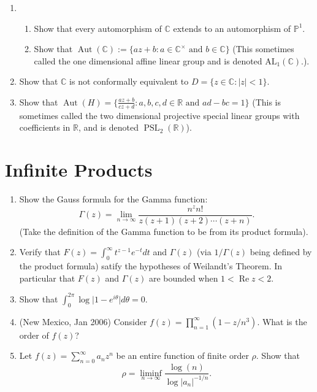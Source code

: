 \documentclass[a4paper,10pt]{article}
\newcommand{\RR}{\mathbb{R}}
\newcommand{\CC}{\mathbb{C}}
\newcommand{\PSL}{\operatorname{PSL}}
\renewcommand{\Re}{\operatorname{Re}}
\newcommand{\PP}{\mathbb{P}}
\newcommand{\Aut}{\operatorname{Aut}}
\begin{document}
\begin{enumerate}
\item 
\begin{enumerate}
	\item Show that every automorphism of $\CC$ extends to an automorphism of $\PP^1$.
	\item Show that $\Aut(\CC):= \lbrace az+b : a \in \CC^{\times} \mbox{ and } b\in \CC \rbrace$ (This sometimes called the one dimensional affine linear group and is denoted $\mathrm{AL}_1(\CC)$.).
\end{enumerate}

\item Show that $\CC$ is not conformally equivalent to $D = \lbrace z \in \CC: \vert z \vert < 1 \rbrace$. 

\item Show that $\Aut(H) = \lbrace \frac{az+b}{cz+d}: a,b,c,d\in \RR \mbox{ and } ad-bc =1 \rbrace$ (This is sometimes called the two dimensional projective special linear groups with coefficients in $\RR$, and is denoted $\PSL_2(\RR)$).

\end{enumerate}

\section{Infinite Products}

\begin{enumerate}
	\item Show the Gauss formula for the Gamma function:
	$$ \Gamma(z) = \lim_{n\to\infty} \frac{n^z n!}{z(z+1)(z+2) \cdots (z+n)}. $$
	(Take the definition of the Gamma function to be from its product formula).
	\item Verify that $F(z) = \int_0^{\infty} t^{z-1}e^{-t}dt$ and $\Gamma(z)$ (via $1/\Gamma(z)$ being defined by the product formula) satify the hypotheses of Weilandt's Theorem. In particular that $F(z)$ and $\Gamma(z)$ are bounded when $1 <\Re z <2$. 
	
	\item Show that $\int_0^{2\pi} \log \vert 1 - e^{i\theta}\vert d\theta=0$.
	
	\item (New Mexico, Jan 2006)
	Consider $f(z) = \prod_{n=1}^{\infty}(1-z/n^3)$.
	What is the order of $f(z)$?
	
	\item Let $f(z) = \sum_{n=0}^{\infty} a_n z^n$ 
	be an entire function of finite order $\rho$. Show that 
	$$ \rho = \liminf_{n\to\infty} \frac{\log(n)}{\log \vert a_n \vert^{-1/n}}.$$
\end{enumerate}
\end{document}
